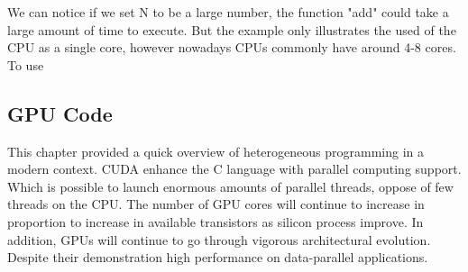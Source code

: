 We can notice if we set N to be a large number, the function "add" could take a large amount of time to execute. But the example only illustrates the used of the CPU as a single core, however nowadays CPUs commonly have around 4-8 cores. To use

\subsection{GPU Code}


\cite{example}

This chapter provided a quick overview of heterogeneous programming in a modern context. CUDA  enhance the C language with parallel computing support. Which is possible to launch  enormous amounts of parallel threads, oppose of few threads on the CPU. The number of GPU cores will continue to increase in proportion to increase in available transistors as silicon process improve. In addition, GPUs will continue to go through vigorous architectural evolution. Despite their demonstration high performance on data-parallel applications. \cite{hwu}








